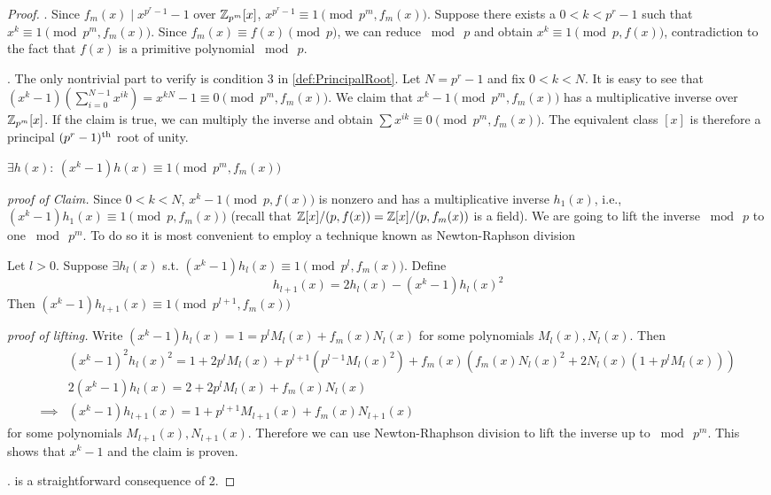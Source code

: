 \begin{proof}
    . \quad Since \(f_m(x) \mid x^{p^r -  1} - 1\) over \(\mathbb{Z}_{p^m}[x]\), \(x^{p^r - 1} \equiv 1 \pmod{p^m, f_m(x)}\). Suppose there exists a \(0 < k < p^r - 1\) such that \(x^k \equiv 1 \pmod{p^m, f_m(x)}\). Since \(f_m(x) \equiv f(x) \pmod{p}\), we can reduce \(\bmod \  p\) and obtain \(x^k \equiv 1 \pmod{p, f(x)}\), contradiction to the fact that \(f(x)\) is a primitive polynomial \(\bmod \  p\).

    \smallskip
    . \quad The only nontrivial part to verify is condition 3 in \cref{def:PrincipalRoot}. Let \(N = p^r - 1\) and fix \(0 < k < N\). It is easy to see that \((x^k - 1)(\sum_{i=0}^{N-1} x^{ik}) = x^{kN} - 1 \equiv 0 \pmod{p^m, f_m(x)}\). We claim that \(x^k - 1 \pmod{p^m, f_m(x)}\) has a multiplicative inverse over \(\mathbb{Z}_{p^m}[x]\). If the claim is true, we can multiply the inverse and obtain \(\sum x^{ik} \equiv 0 \pmod{p^m, f_m(x)}\). The equivalent class \([x]\) is therefore a principal \((p^r - 1)\textsuperscript{th}\) root of unity.

    \medskip
     \(\exists h(x):\: (x^k - 1)h(x) \equiv 1 \pmod{p^m, f_m(x)}\)

    \noindent\emph{proof of Claim.} \quad Since \(0 < k < N\), \(x^k - 1 \pmod{p, f(x)}\) is nonzero and has a multiplicative inverse \(h_1(x)\), i.e., \((x^k - 1)h_1(x) \equiv 1 \pmod{p, f_m(x)}\) (recall that \(\mathbb{Z}[x]/(p, f(x)) = \mathbb{Z}[x]/(p, f_m(x))\) is a field). We are going to lift the inverse \(\bmod \  p\) to one \(\bmod \  p^m\). To do so it is most convenient to employ a technique known as Newton-Raphson division~\cite{MISC:WikiNewton}

    \smallskip
    Let \(l > 0\). Suppose \(\exists h_l(x)\) s.t. \((x^k - 1)h_l(x) \equiv 1 \pmod{p^l, f_m(x)}\). Define
    \[h_{l+1}(x) = 2 h_l(x) - (x^k - 1)h_l(x)^2\]
    Then \((x^k - 1)h_{l+1}(x) \equiv 1 \pmod{p^{l+1}, f_m(x)}\)

    \noindent\emph{proof of lifting.} \quad Write \((x^k - 1)h_l(x) = 1 = p^l M_l(x) + f_m(x) N_l(x)\) for some polynomials \(M_l(x), N_l(x)\). Then
    \begin{align*}
        &(x^k - 1)^2h_l(x)^2 = 1 + 2p^l M_l(x) + p^{l+1}(p^{l-1}M_l(x)^2) + f_m(x)\left(f_m(x) N_l(x)^2 + 2 N_l(x) (1 + p^l M_l(x)) \right) \\
        &2(x^k - 1)h_l(x) = 2 + 2p^l M_l(x) + f_m(x) N_l(x) \\
        \implies &(x^k - 1)h_{l+1}(x) = 1 + p^{l+1} M_{l+1}(x) + f_m(x) N_{l+1}(x)
    \end{align*}
    for some polynomials \(M_{l+1}(x), N_{l+1}(x)\). Therefore we can use Newton-Rhaphson division to lift the inverse up to \(\bmod \  p^m\). This shows that \(x^k - 1\) and the claim is proven.

    \medskip
    . \quad is a straightforward consequence of 2.
\end{proof}